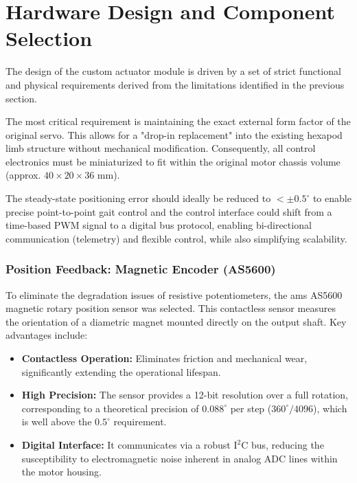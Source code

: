 \section{Hardware Design and Component Selection}
\label{sec:hardware}

The design of the custom actuator module is driven by a set of strict functional and physical requirements
derived from the limitations identified in the previous section.

The most critical requirement is maintaining the exact external form factor of the original servo. This
allows for a "drop-in replacement" into the existing hexapod limb structure without mechanical modification.
Consequently, all control electronics must be miniaturized to fit within the original motor chassis volume
(approx. $40 \times 20 \times 36$ mm).

The steady-state positioning error should ideally be reduced to $<\pm 0.5^{\circ}$ to enable precise
point-to-point gait control and the control interface could shift from a time-based PWM signal to a digital bus
protocol, enabling bi-directional communication (telemetry) and flexible control, while also simplifying
scalability.


\subsubsection{Position Feedback: Magnetic Encoder (AS5600)}

To eliminate the degradation issues of resistive potentiometers, the ams AS5600 \cite{as5600} magnetic rotary
position sensor was selected. This contactless sensor measures the orientation of a diametric magnet mounted
directly on the output shaft. Key advantages include:

\begin{itemize}
    \item \textbf{Contactless Operation:} Eliminates friction and mechanical wear, significantly extending
        the operational lifespan.
    \item \textbf{High Precision:} The sensor provides a 12-bit resolution over a full rotation,
        corresponding to a theoretical precision of $0.088^{\circ}$ per step ($360^{\circ}/4096$), which is
        well above the $0.5^{\circ}$ requirement.
    \item \textbf{Digital Interface:} It communicates via a robust $\text{I}^2\text{C}$ bus, reducing the
        susceptibility to electromagnetic noise inherent in analog ADC lines within the motor housing.
\end{itemize}



